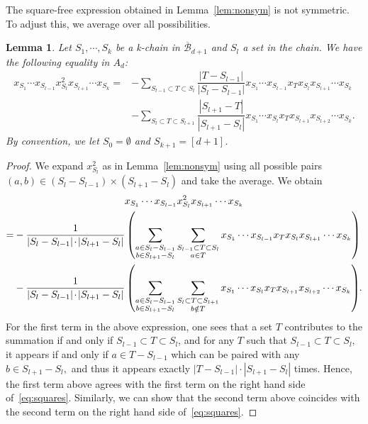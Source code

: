 \documentclass[10pt,a4paper]{amsart}
\newtheorem{lemm}[thm]{Lemma}
\theoremstyle{definition}
\newcommand{\hB}{\overline{\mathcal B}}
\newcommand*{\Mk}{\mkern -2mu}
\begin{document}
The square-free expression obtained in Lemma~\ref{lem:nonsym} is not symmetric. To adjust this, we average over all possibilities.
\begin{lemm}\label{lem:squares}
	Let $S_1,\cdots,S_k$ be a k-chain in $\hB_{d+1}$ and $S_l$ a set in the chain. We have the following equality in $A_d$:
	\begin{align}
	x_{S_1}\cdots x_{S_{l-1}}x_{S_l}^2x_{S_{l+1}}\cdots x_{S_k} =& -\sum_{S_{l-1}\subset T\subset S_l} \dfrac{|T-S_{l-1}|}{|S_l-S_{l-1}|} x_{S_1}\cdots x_{S_{l-1}}x_Tx_{S_l}x_{S_{l+1}}\cdots x_{S_k} \label{eq:squares}\\
	& -\sum_{S_{l}\subset T\subset S_{l+1}} \dfrac{|S_{l+1}-T|}{|S_{l+1}-S_{l}|} x_{S_1}\cdots x_{S_{l}}x_Tx_{S_{l+1}}x_{S_{l+2}}\cdots x_{S_k}.\nonumber
	\end{align}
	By convention, we let $S_0=\emptyset$ and $S_{k+1}=[d+1]$.
\end{lemm}
\begin{proof}
	We expand $x_{S_l}^2$ as in Lemma~\ref{lem:nonsym} using all possible pairs $(a,b)\in (S_{l}-S_{l-1})\times (S_{l+1}-S_{l})$ and take the average. We obtain
\begin{multline*}
	 x_{S_1}\cdots x_{S_{l-1}}x_{S_l}^2x_{S_{l+1}}\cdots x_{S_k} \\
	\begin{aligned}
	=& -\frac{1}{|S_l-S_{l-1}|\Mk\cdot\Mk |S_{l+1}-S_l|} \left( \sum_{\substack{a \in S_l- S_{l-1} \\ 
	b \in S_{l+1}-S_l}} \sum_{\substack{S_{l-1}\subset T\subset S_{l} \\ a\in T}} x_{S_1}\cdots x_{S_{l-1}}x_Tx_{S_l}x_{S_{l+1}}\cdots x_{S_k}\right) \\
	& - \frac{1}{|S_l-S_{l-1}|\Mk\cdot\Mk |S_{l+1}-S_l|} \left(\sum_{\substack{a \in S_l- S_{l-1} \\ 
	b \in S_{l+1}-S_l}} \sum_{\substack{S_l\subset T\subset S_{l+1} \\ 
	b\notin T}} x_{S_1}\cdots x_{S_{l}}x_Tx_{S_{l+1}}x_{S_{l+2}}\cdots x_{S_k} \right)\Mk\Mk.
	\end{aligned}
	\end{multline*}
	For the first term in the above expression, one sees that a set $T$ contributes to the summation if and only if $S_{l-1}\subset T\subset S_l$, and for any $T$ %
	such that $ S_{l-1}\subset T\subset S_l,$ it appears if and only if $a \in T-S_{l-1}$ which can be paired with any $b \in S_{l+1}-S_l,$ and thus it appears exactly $|T-S_{l-1}|\cdot |S_{l+1}-S_l|$ times. Hence, the first term above agrees with the first term on the right hand side of~\eqref{eq:squares}. Similarly, we can show that the second term above coincides with the second term on the right hand side of~\eqref{eq:squares}.
\end{proof}
\end{document}
